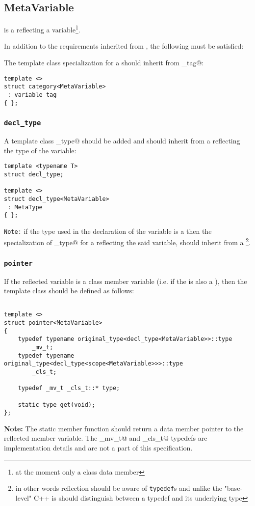 \subsection{MetaVariable}
\label{concept-MetaVariable}

 is a  reflecting a variable\footnote{
at the moment only a class data member}.

In addition to the requirements inherited from , the following must
be satisfied:

The \verb@category@ template class specialization for a  should
inherit from \verb@variable_tag@:

\begin{verbatim}
template <>
struct category<MetaVariable>
 : variable_tag
{ };
\end{verbatim}

\subsubsection{\texttt{decl\_type}}

A template class \verb@decl_type@ should be added and should inherit
from a  reflecting the type of the variable:

\begin{verbatim}
template <typename T>
struct decl_type;

template <>
struct decl_type<MetaVariable>
 : MetaType
{ };
\end{verbatim}

\texttt{Note:} if the type used in the declaration of the variable
is a \verb@typedef@ then the specialization of \verb@decl_type@ for
a  reflecting the said variable, should
inherit from a \footnote{in other words reflection
should be aware of \texttt{typedef}s and unlike the "base-level" C++
is should distinguish between a typedef and its underlying type}.

\subsubsection{\texttt{pointer}}

If the reflected variable is a class member variable (i.e. if the 
is also a ), then the \verb@pointer@ template class should be
defined as follows:

\begin{verbatim}

template <>
struct pointer<MetaVariable>
{
	typedef typename original_type<decl_type<MetaVariable>>::type
		_mv_t;
	typedef typename original_type<decl_type<scope<MetaVariable>>>::type
		_cls_t;

	typedef _mv_t _cls_t::* type;

	static type get(void);
};

\end{verbatim}

\textbf{Note:} The static member function \verb@get@ should return a data member pointer to
the reflected member variable. The \verb@_mv_t@ and \verb@_cls_t@ typedefs
are implementation details and are not a part of this specification.
